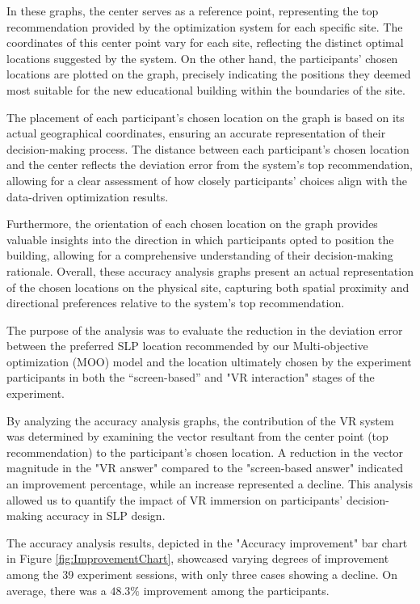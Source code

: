 In these graphs, the center serves as a reference point, representing the top recommendation provided by the optimization system for each specific site.
The coordinates of this center point vary for each site, reflecting the distinct optimal locations suggested by the system.
On the other hand, the participants' chosen locations are plotted on the graph, precisely indicating the positions they deemed most suitable for the new educational building within the boundaries of the site.

The placement of each participant's chosen location on the graph is based on its actual geographical coordinates, ensuring an accurate representation of their decision-making process.
The distance between each participant's chosen location and the center reflects the deviation error from the system's top recommendation, allowing for a clear assessment of how closely participants' choices align with the data-driven optimization results.

Furthermore, the orientation of each chosen location on the graph provides valuable insights into the direction in which participants opted to position the building, allowing for a comprehensive understanding of their decision-making rationale.
Overall, these accuracy analysis graphs present an actual representation of the chosen locations on the physical site, capturing both spatial proximity and directional preferences relative to the system's top recommendation.

The purpose of the analysis was to evaluate the reduction in the deviation error between the preferred SLP location recommended by our Multi-objective optimization (MOO) model and the location ultimately chosen by the experiment participants in both the ``screen-based'' and "VR interaction" stages of the experiment.

By analyzing the accuracy analysis graphs, the contribution of the VR system was determined by examining the vector resultant from the center point (top recommendation) to the participant's chosen location.
A reduction in the vector magnitude in the "VR answer" compared to the "screen-based answer" indicated an improvement percentage, while an increase represented a decline.
This analysis allowed us to quantify the impact of VR immersion on participants' decision-making accuracy in SLP design.

The accuracy analysis results, depicted in the "Accuracy improvement" bar chart in Figure \ref{fig:ImprovementChart}, showcased varying degrees of improvement among the 39 experiment sessions, with only three cases showing a decline.
On average, there was a \(48.3\%\) improvement among the participants.

